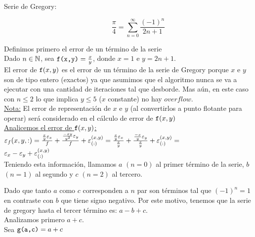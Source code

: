 \begin{description}
	\item[Serie de Gregory:]
		\begin{equation*}
		\frac{\pi}{4} = \sum_{n=0}^{\infty} \frac{\left(-1\right)^n}{2n+1}
		\end{equation*}
\end{description}
	
	Definimos primero el error de un término de la serie\\
	
	Dado $n \in \mathbb{N}$, sea $\texttt{f(x,y)}=\frac{x}{y}$, donde $x=1$ e $y=2n+1$.\\
	
	El error de $\texttt{f}(x,y)$ es el error de un término de la serie de Gregory porque $x$ e $y$ son de tipo entero (exactos) ya que asumimos que el algoritmo
	nunca se va a ejecutar con una cantidad de iteraciones tal que desborde. Mas aún, en este caso con $n \leq 2$ lo que implica $y \leq 5$ ($x$ constante) no hay $overflow$.\\
	
	\underline{Nota:} El error de representación de $x$ e $y$ (al convertirlos a punto flotante para operar) será considerado en el cálculo de error de $\texttt{f}(x,y)$\\
	
	\underline{Analicemos el error de $\texttt{f}(x,y)$:}\\
	
	$\texttt{$\varepsilon _{f}({x,y,:})$}=\frac{\frac{x}{y}\varepsilon _{x}}{f} + \frac{\frac{-xy}{y^2}\varepsilon _{y}}{f} + \varepsilon _{({:})}^{({x,y})} = 
	\frac{\frac{x}{y}\varepsilon _{x}}{\frac{x}{y}} + \frac{\frac{-x}{y}\varepsilon _{y}}{\frac{x}{y}} + \varepsilon _{({:})}^{({x,y})} =$\\
	
	$\varepsilon _{x} - \varepsilon _{y} + \varepsilon _{({:})}^{({x,y})}$\\
	
	Teniendo esta información, llamamos $a$ $(n=0)$ al primer término de la serie, $b$ $(n=1)$ al segundo y $c$ $(n=2)$ al tercero.
	
	Dado que tanto $a$ como $c$ corresponden a $n$ par son términos tal que $(-1)^n = 1$ en contraste con $b$ que tiene signo negativo. Por este motivo,
	tenemos que la serie de gregory hasta el tercer término es: $a - b + c$.\\
	
	Analizamos primero $a+c$.\\
	
	Sea $\texttt{g(a,c)}=a+c$\\
	
